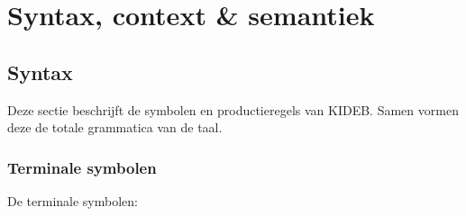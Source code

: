 \chapter{Syntax, context \& semantiek}
    \label{chap:syntax_context_en_semantiek}
\section{Syntax}
Deze sectie beschrijft de symbolen en productieregels van KIDEB. Samen vormen deze de totale grammatica van de taal.
\subsection{Terminale symbolen}
De terminale symbolen:
\begin{description}
    \item \itab{:}\stab{;}\stab{(}\stab{)}\stab{[}
    \item \itab{]}\stab{\{}\stab{\}}\stab{,}\stab{\textbackslash}
    \item {}\stab{+}\stab{-}\stab{/}\stab{\textless}
    \item \itab{\^}\stab{=}\stab{\textless}\stab{\textgreater}\stab{\textgreater =}
    \item \itab{!}\stab{\textless =}\stab{==}\stab{\textbar \textbar}\stab{\&\&}
    \item {}
    \item {}
    \item {}
    \item {}
    \item {}
\end{description}

